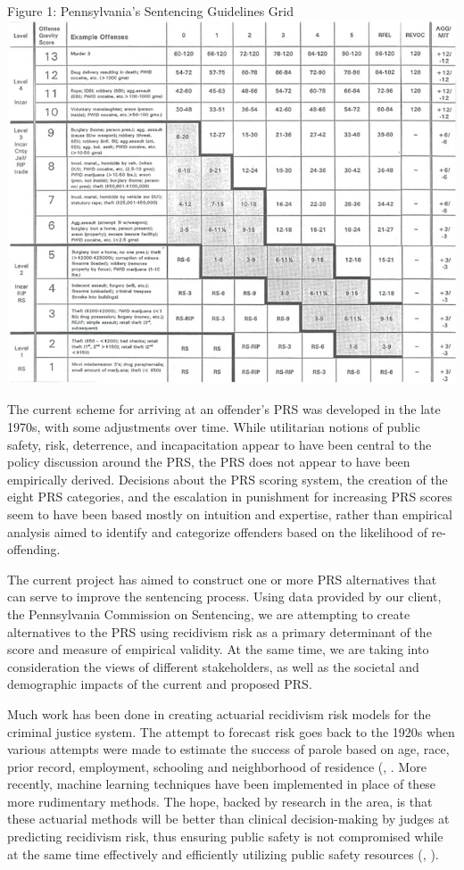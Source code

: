\documentclass{article}
\begin{document}
\begin{center}
Figure 1: Pennsylvania's Sentencing Guidelines Grid
\includegraphics[scale=0.5]{sentencing_table.jpg}
\end{center}

The current scheme for arriving at an offender's PRS was developed in the late 1970s, with some adjustments over time. While utilitarian notions of public safety, risk, deterrence, and incapacitation appear to have been central to the policy discussion around the PRS, the PRS does not appear to have been empirically derived. Decisions about the PRS scoring system, the creation of the eight PRS categories, and the escalation in punishment for increasing PRS scores seem to have been based mostly on intuition and expertise, rather than empirical analysis aimed to identify and categorize offenders based on the likelihood of re-offending. 

The current project has aimed to construct one or more PRS alternatives that can serve to improve the sentencing process. Using data provided by our client, the Pennsylvania Commission on Sentencing, we are attempting to create alternatives to the PRS using recidivism risk as a primary determinant of the score and measure of empirical validity. At the same time, we are taking into consideration the views of different stakeholders, as well as the societal and demographic impacts of the current and proposed PRS.  

Much work has been done in creating actuarial recidivism risk models for the criminal justice system.\cite{review} The attempt to forecast risk goes back to the 1920s when various attempts were made to estimate the success of parole based on age, race, prior record, employment, schooling and neighborhood of residence (\cite{borden}, \cite{burgess}. More recently, machine learning techniques have been implemented in place of these more rudimentary methods. The hope, backed by research in the area, is that these actuarial methods will be better than clinical decision-making by judges at predicting recidivism risk, thus ensuring public safety is not compromised while at the same time effectively and efficiently utilizing public safety resources (\cite{dawes}, \cite{grove_and_meehl}).
\end{document}
